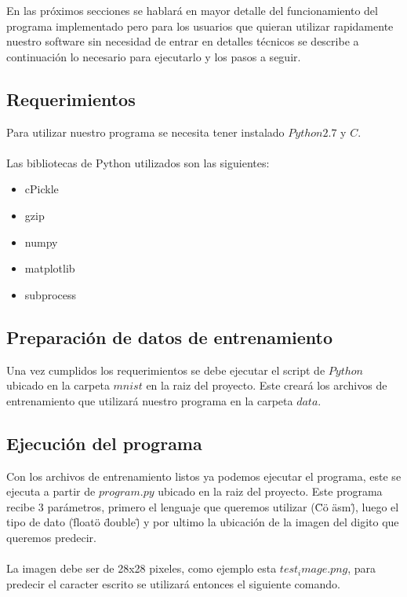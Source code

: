 
En las próximos secciones se hablará en mayor detalle del funcionamiento del programa implementado pero para los usuarios que quieran utilizar rapidamente nuestro software sin necesidad de entrar en detalles técnicos se describe a continuación lo necesario para ejecutarlo y los pasos a seguir.

\subsection{Requerimientos}

Para utilizar nuestro programa se necesita tener instalado $Python 2.7$ y $C$.
\\
\\
Las bibliotecas de Python utilizados son las siguientes:

\begin{itemize}

\item cPickle
\item gzip
\item numpy
\item matplotlib
\item subprocess

\end{itemize}

\subsection{Preparación de datos de entrenamiento}

Una vez cumplidos los requerimientos se debe ejecutar el script de $Python$ ubicado en la carpeta $mnist$ en la raiz del proyecto. Este creará los archivos de entrenamiento que utilizará nuestro programa en la carpeta $data$.

\subsection{Ejecución del programa}

Con los archivos de entrenamiento listos ya podemos ejecutar el programa, este se ejecuta a partir de $program.py$ ubicado en la raiz del proyecto. Este programa recibe 3 parámetros, primero el lenguaje que queremos utilizar (\"C\" o \"asm\"), luego el tipo de dato (\"float\" o \"double\") y por ultimo la ubicación de la imagen del digito que queremos predecir.
\\
\\
La imagen debe ser de 28x28 pixeles, como ejemplo esta $test_image.png$, para predecir el caracter escrito se utilizará entonces el siguiente comando.

